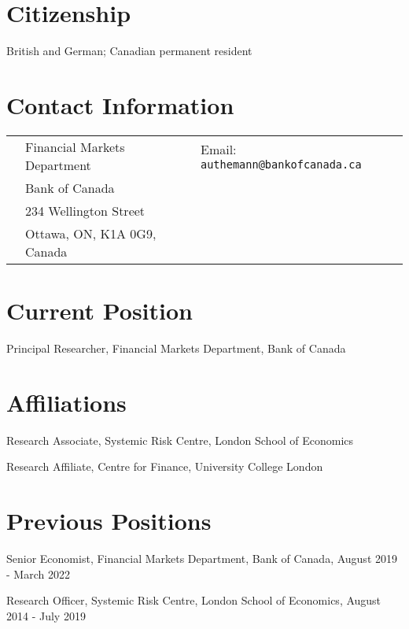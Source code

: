 \documentclass[margin,line, 11pt]{res}
\newenvironment{list1}{
  \begin{list}{\ding{113}}{%
      \setlength{\itemsep}{0in}
      \setlength{\parsep}{0in} \setlength{\parskip}{0in}
      \setlength{\topsep}{0in} \setlength{\partopsep}{0in} 
      \setlength{\leftmargin}{0.17in}}}{\end{list}}
\begin{document}

\begin{resume}
\thispagestyle{plain} %

\section{\sc Citizenship}
\begin{list1}
\item[] British and German; Canadian permanent resident 
\end{list1}

\section{\sc Contact Information}
\vspace{.05in}
\begin{tabular}{@{}p{0.20in}p{2.4in}p{2.75in}}
 & Financial Markets Department  &  Email: 
\texttt{authemann@bankofcanada.ca} \\            
 & Bank of Canada   &  \\         
 & 234 Wellington Street \\       
 & Ottawa, ON, K1A 0G9, Canada
\end{tabular}


\section{\sc Current Position}
\begin{list1}
\item[] Principal Researcher, Financial Markets Department, Bank of Canada
\end{list1}

\section{\sc Affiliations}
\begin{list1}
\item[] Research Associate, Systemic Risk Centre, London School of Economics
\item[] Research Affiliate, Centre for Finance, University College London
\end{list1}

\section{\sc Previous Positions}
\begin{list1}
\item[] Senior Economist, Financial Markets Department, Bank of Canada, August 2019 - March 2022
\item[] Research Officer, Systemic Risk Centre, London School of Economics, August 2014 - July 2019
\end{list1}


\end{resume}
\end{document}
